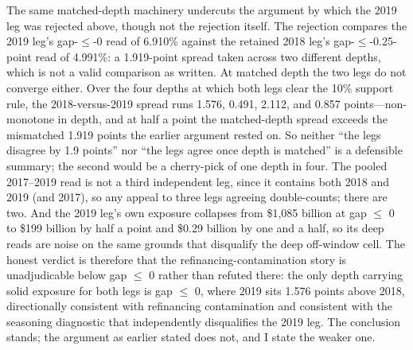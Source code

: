 \documentclass[12pt]{article}
\begin{document}
The same matched-depth machinery undercuts the argument by which the 2019 leg was rejected above, though not the rejection itself. The rejection compares the 2019 leg's gap-$\leq$-0 read of 6.910\% against the retained 2018 leg's gap-$\leq$-0.25-point read of 4.991\%: a 1.919-point spread taken across two different depths, which is not a valid comparison as written. At matched depth the two legs do not converge either. Over the four depths at which both legs clear the 10\% support rule, the 2018-versus-2019 spread runs 1.576, 0.491, 2.112, and 0.857 points---non-monotone in depth, and at half a point the matched-depth spread exceeds the mismatched 1.919 points the earlier argument rested on. So neither ``the legs disagree by 1.9 points'' nor ``the legs agree once depth is matched'' is a defensible summary; the second would be a cherry-pick of one depth in four. The pooled 2017--2019 read is not a third independent leg, since it contains both 2018 and 2019 (and 2017), so any appeal to three legs agreeing double-counts; there are two. And the 2019 leg's own exposure collapses from \$1{,}085 billion at gap $\leq$ 0 to \$199 billion by half a point and \$0.29 billion by one and a half, so its deep reads are noise on the same grounds that disqualify the deep off-window cell. The honest verdict is therefore that the refinancing-contamination story is unadjudicable below gap $\leq$ 0 rather than refuted there: the only depth carrying solid exposure for both legs is gap $\leq$ 0, where 2019 sits 1.576 points above 2018, directionally consistent with refinancing contamination and consistent with the seasoning diagnostic that independently disqualifies the 2019 leg. The conclusion stands; the argument as earlier stated does not, and I state the weaker one.
\end{document}
